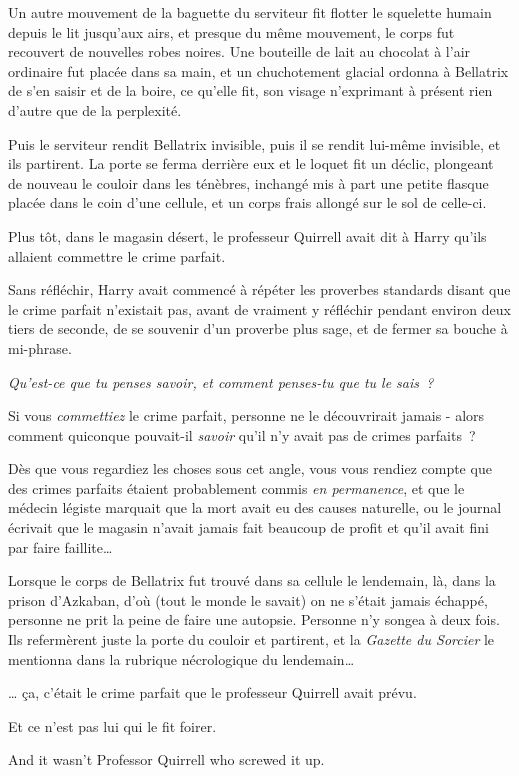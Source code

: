 Un autre mouvement de la baguette du serviteur fit flotter le squelette humain depuis le lit jusqu'aux airs, et presque du même mouvement, le corps fut recouvert de nouvelles robes noires. Une bouteille de lait au chocolat à l'air ordinaire fut placée dans sa main, et un chuchotement glacial ordonna à Bellatrix de s'en saisir et de la boire, ce qu'elle fit, son visage n'exprimant à présent rien d'autre que de la perplexité.

Puis le serviteur rendit Bellatrix invisible, puis il se rendit lui-même invisible, et ils partirent. La porte se ferma derrière eux et le loquet fit un déclic, plongeant de nouveau le couloir dans les ténèbres, inchangé mis à part une petite flasque placée dans le coin d'une cellule, et un corps frais allongé sur le sol de celle-ci.

\later

Plus tôt, dans le magasin désert, le professeur Quirrell avait dit à Harry qu'ils allaient commettre le crime parfait.

Sans réfléchir, Harry avait commencé à répéter les proverbes standards disant que le crime parfait n'existait pas, avant de vraiment y réfléchir pendant environ deux tiers de seconde, de se souvenir d'un proverbe plus sage, et de fermer sa bouche à mi-phrase.

\emph{Qu'est-ce que tu penses savoir, et comment penses-tu que tu le sais~?}

Si vous \emph{commettiez} le crime parfait, personne ne le découvrirait jamais - alors comment quiconque pouvait-il \emph{savoir} qu'il n'y avait pas de crimes parfaits~?

Dès que vous regardiez les choses sous cet angle, vous vous rendiez compte que des crimes parfaits étaient probablement commis \emph{en permanence}, et que le médecin légiste marquait que la mort avait eu des causes naturelle, ou le journal écrivait que le magasin n'avait jamais fait beaucoup de profit et qu'il avait fini par faire faillite…

Lorsque le corps de Bellatrix fut trouvé dans sa cellule le lendemain, là, dans la prison d'Azkaban, d'où (tout le monde le savait) on ne s'était jamais échappé, personne ne prit la peine de faire une autopsie. Personne n'y songea à deux fois. Ils refermèrent juste la porte du couloir et partirent, et la \emph{Gazette du Sorcier} le mentionna dans la rubrique nécrologique du lendemain…

… ça, c'était le crime parfait que le professeur Quirrell avait prévu.

Et ce n'est pas lui qui le fit foirer. 

And it wasn’t Professor Quirrell who screwed it up.
